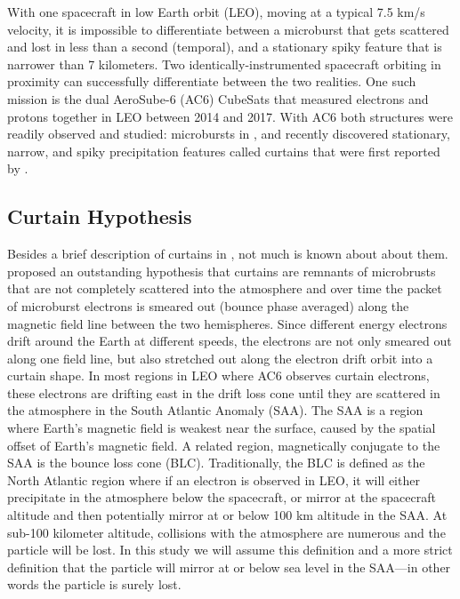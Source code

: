 \documentclass[draft]{agujournal2019}
\begin{document}
With one spacecraft in low Earth orbit (LEO), moving at a typical 7.5 km/s velocity, it is impossible to differentiate between a microburst that gets scattered and lost in less than a second (temporal), and a stationary spiky feature that is narrower than 7 kilometers. Two identically-instrumented spacecraft orbiting in proximity can successfully differentiate between the two realities. One such mission is the dual AeroSube-6 (AC6) CubeSats that measured electrons and protons together in LEO between 2014 and 2017. With AC6 both structures were readily observed and studied: microbursts in , and recently discovered stationary, narrow, and spiky precipitation features called curtains that were first reported by .

\subsection{Curtain Hypothesis}
Besides a brief description of curtains in , not much is known about about them.  proposed an outstanding hypothesis that curtains are remnants of microbrusts that are not completely scattered into the atmosphere and over time the packet of microburst electrons is smeared out (bounce phase averaged) along the magnetic field line between the two hemispheres. Since different energy electrons drift around the Earth at different speeds, the electrons are not only smeared out along one field line, but also stretched out along the electron drift orbit into a curtain shape. In most regions in LEO where AC6 observes curtain electrons, these electrons are drifting east in the drift loss cone until they are scattered in the atmosphere in the South Atlantic Anomaly (SAA). The SAA is a region where Earth's magnetic field is weakest near the surface, caused by the spatial offset of Earth's magnetic field. A related region, magnetically conjugate to the SAA is the bounce loss cone (BLC). Traditionally, the BLC is defined as the North Atlantic region where if an electron is observed in LEO, it will either precipitate in the atmosphere below the spacecraft, or mirror at the spacecraft altitude and then potentially mirror at or below 100 km altitude in the SAA. At sub-100 kilometer altitude, collisions with the atmosphere are numerous and the particle will be lost. In this study we will assume this definition and a more strict definition that the particle will mirror at or below sea level in the SAA---in other words the particle is surely lost.
\end{document}
